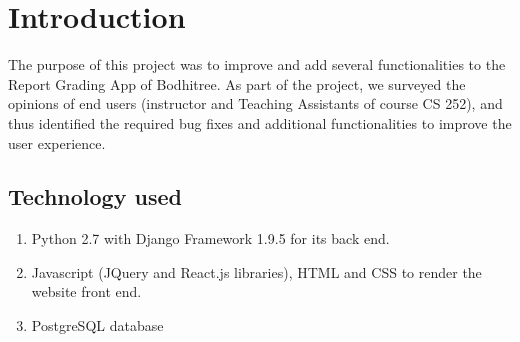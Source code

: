 \section{Introduction}
The purpose of this project was to improve and add several functionalities to the Report Grading App of Bodhitree. As part of the project, we surveyed the opinions of end users (instructor and Teaching Assistants of course CS 252), and thus identified the required bug fixes and additional functionalities to improve the user experience.

\subsection{Technology used} %
\begin{enumerate}
\item Python 2.7 with Django Framework 1.9.5 for its back end.
\item Javascript (JQuery and React.js libraries), HTML and CSS to render the website front end.
\item PostgreSQL database
\end{enumerate}
